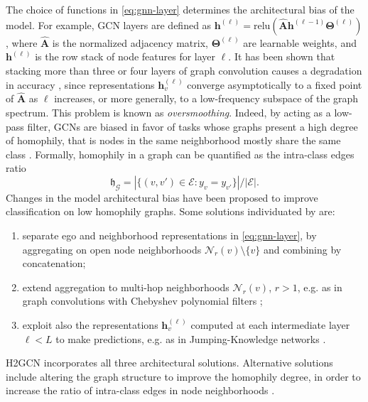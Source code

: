 \documentclass{esannV2p}
\begin{document}
The choice of functions in \eqref{eq:gnn-layer} determines the architectural bias of the model.
For example, GCN \cite{Kipf2017} layers are defined as $\mathbf{h}^{(\ell)} = \mathrm{relu}(\mathbf{\hat{A}} \mathbf{h}^{(\ell-1)} \mathbf{\Theta}^{(\ell)})$,
where $\mathbf{\hat{A}}$ is the normalized adjacency matrix, $\mathbf{\Theta}^{(\ell)}$ are learnable weights, and $\mathbf{h}^{(\ell)}$ is the row stack of node features for layer $\ell$.
It has been shown that stacking more than three or four layers of graph convolution causes a degradation in accuracy \cite{Li2018}, since representations $\mathbf{h}_v^{(\ell)}$ converge asymptotically to a fixed point of $\mathbf{\hat{A}}$ as $\ell$ increases, or more generally, to a low-frequency subspace of the graph spectrum.
This problem is known as \emph{oversmoothing}.
Indeed, by acting as a low-pass filter, GCNs are biased in favor of tasks whose graphs present a high degree of homophily, that is nodes in the same neighborhood mostly share the same class \citep{Zhu2020}.
Formally, homophily in a graph can be quantified \citep{Zhu2020} as the intra-class edges ratio
\begin{equation}\label{eq:homophily}\mathfrak{h}_\mathcal{G} = \left|\{(v, v') \in \mathcal{E} : y_v = y_{v'}\}\right| / \left|\mathcal{E}\right|.
\end{equation}
Changes in the model architectural bias have been proposed to improve classification on low homophily graphs.
Some solutions individuated by \cite{Zhu2020} are:
\begin{enumerate}[itemsep=0mm]
  \item separate ego and neighborhood representations in \eqref{eq:gnn-layer}, by aggregating on open node neighborhoods $\mathcal{N}_r(v) \setminus \{v\}$ and combining by concatenation;
  \item extend aggregation to multi-hop neighborhoods $\mathcal{N}_r(v)$, $r > 1$, e.g. as in graph convolutions with Chebyshev polynomial filters \cite{Defferrard2016};
  \item exploit also the representations $\mathbf{h}_v^{(\ell)}$ computed at each intermediate layer $\ell < L$ to make predictions, e.g. as in Jumping-Knowledge networks \cite{Xu2018}.
\end{enumerate}
H2GCN \cite{Zhu2020} incorporates all three architectural solutions.
Alternative solutions include altering the graph structure to improve the homophily degree, in order to increase the ratio of intra-class edges in node neighborhoods \cite{Gasteiger2019,Topping2022}.
\end{document}
